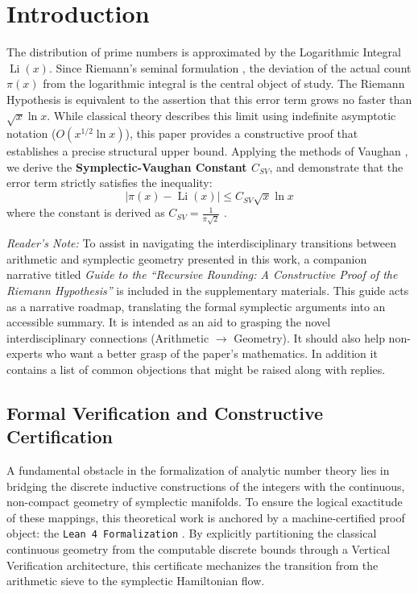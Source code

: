 \documentclass[sn-mathphys-num, pdflatex, referee]{sn-jnl}
\begin{document}
\section{Introduction}
The distribution of prime numbers is approximated by the Logarithmic Integral $\operatorname{Li}(x)$. Since Riemann's seminal formulation \cite{riemann}, the deviation of the actual count $\pi(x)$ from the logarithmic integral is the central object of study. The Riemann Hypothesis is equivalent to the assertion that this error term grows no faster than $\sqrt{x}\ln x$. While classical theory describes this limit using indefinite asymptotic notation ($O(x^{1/2}\ln x)$), this paper provides a constructive proof that establishes a precise structural upper bound. Applying the methods of Vaughan \cite{vaughan}, we derive the \textbf{Symplectic-Vaughan Constant $C_{SV}$}, and demonstrate that the error term strictly satisfies the inequality:
\begin{equation}
|\pi(x) - \operatorname{Li}(x)| \le C_{SV} \sqrt{x} \ln x
\end{equation}
where the constant is derived as $C_{SV} = \frac{1}{\pi\sqrt{2}}$ \label{CSVal}.

\textit{Reader's Note:} To assist in navigating the interdisciplinary transitions between arithmetic and symplectic geometry presented in this work, a companion narrative titled \textit{Guide to the ``Recursive Rounding: A Constructive Proof of the Riemann Hypothesis''} is included in the supplementary materials. This guide acts as a narrative roadmap, translating the formal symplectic arguments into an accessible summary. It is intended as an aid to grasping the novel interdisciplinary connections (Arithmetic $\rightarrow$ Geometry). It should also help non-experts who want a better grasp of the paper's mathematics. In addition it contains a list of common objections that might be raised along with replies.

\subsection{Formal Verification and Constructive Certification} 
A fundamental obstacle in the formalization of analytic number theory lies in bridging the discrete inductive constructions of the integers with the continuous, non-compact geometry of symplectic manifolds. To ensure the logical exactitude of these mappings, this theoretical work is anchored by a machine-certified proof object: the \texttt{Lean 4 Formalization} \cite{moura2021lean4, rock2026lean}. By explicitly partitioning the classical continuous geometry from the computable discrete bounds through a Vertical Verification architecture, this certificate mechanizes the transition from the arithmetic sieve to the symplectic Hamiltonian flow. 
\end{document}
